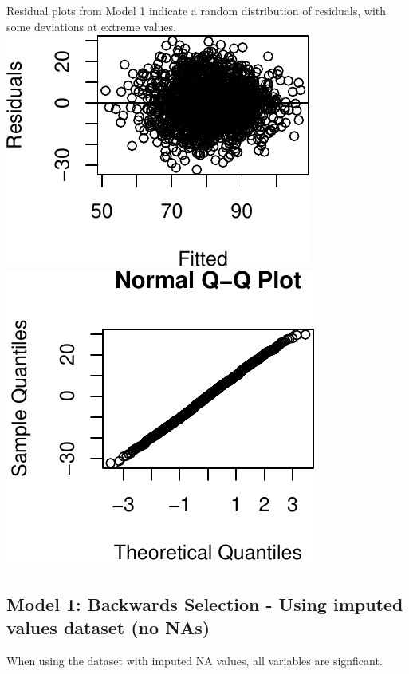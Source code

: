 \documentclass[]{article}
\begin{document}
Residual plots from Model 1 indicate a random distribution of residuals,
with some deviations at extreme values.\\
\includegraphics{DATA621-Homework-1_files/figure-latex/unnamed-chunk-21-1.pdf}
\includegraphics{DATA621-Homework-1_files/figure-latex/unnamed-chunk-21-2.pdf}

\subsection{Model 1: Backwards Selection - Using imputed values dataset
(no
NAs)}\label{model-1-backwards-selection---using-imputed-values-dataset-no-nas}

When using the dataset with imputed NA values, all variables are
signficant.
\end{document}
